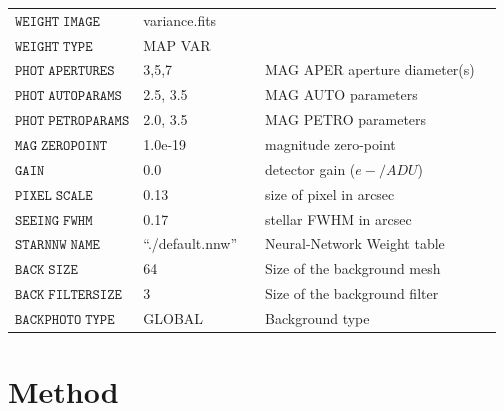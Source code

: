 \begin{table}
\begin{center}
\begin{tabular}{@{}lllll}
  $\mathtt{WEIGHT \; IMAGE}$ & variance.fits & &  \\
  $\mathtt{WEIGHT \; TYPE}$ & MAP VAR & &  \\
  $\mathtt{PHOT \; APERTURES}$ & 3,5,7 & &  MAG APER aperture diameter(s)\\
  $\mathtt{PHOT \; AUTOPARAMS}$ & 2.5, 3.5 & &  MAG AUTO parameters\\
  $\mathtt{PHOT \; PETROPARAMS}$ & 2.0, 3.5 & &  MAG PETRO parameters \\
  $\mathtt{MAG \; ZEROPOINT}$ & 1.0e-19  & &  magnitude zero-point \\
  $\mathtt{GAIN}$ & 0.0 & &  detector gain ($e-/ADU$) \\
  $\mathtt{PIXEL \; SCALE}$ & 0.13 & &  size of pixel in arcsec\\
  $\mathtt{SEEING \; FWHM}$ & 0.17 & &  stellar FWHM in arcsec \\
  $\mathtt{STARNNW \; NAME}$ & ``./default.nnw'' & &  Neural-Network Weight table\\
  $\mathtt{BACK \; SIZE}$ & 64 & &  Size of the background mesh\\
  $\mathtt{BACK \; FILTERSIZE}$ & 3 & &  Size of the background filter\\
  $\mathtt{BACKPHOTO \; TYPE}$ & GLOBAL & &  Background type\\
 \hline
  \end{tabular}
\end{center}
\end{table}

\clearpage

\section{Method}\label{sec:hstmethod}

